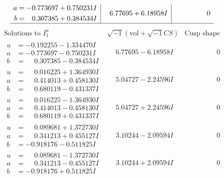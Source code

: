 \documentclass[1p]{elsarticle_modified}
\theoremstyle{definition}
\newcommand{\I}{\sqrt{-1}}
\begin{document}
$$\begin{array}{c|c|c}
\begin{aligned}
a &= -0.773697 + 0.750231 I \\
b &= \phantom{-}0.307385 + 0.384534 I\end{aligned}
 & \phantom{-}6.77695 + 6.18958 I & \phantom{-0.000000 } 0\\
 \hline 
 \end{array}$$\newpage$$\begin{array}{c|c|c}  
\text{Solutions to }I^u_{1}& \I (\text{vol} + \sqrt{-1}CS) & \text{Cusp shape}\\
 \hline 
\begin{aligned}
u &= -0.192255 - 1.334470 I \\
a &= -0.773697 - 0.750231 I \\
b &= \phantom{-}0.307385 - 0.384534 I\end{aligned}
 & \phantom{-}6.77695 - 6.18958 I & \phantom{-0.000000 } 0 \\ \hline\begin{aligned}
u &= \phantom{-}0.016225 + 1.364930 I \\
a &= \phantom{-}0.414013 + 0.458130 I \\
b &= \phantom{-}0.680119 - 0.431337 I\end{aligned}
 & \phantom{-}5.04727 - 2.24596 I & \phantom{-0.000000 } 0 \\ \hline\begin{aligned}
u &= \phantom{-}0.016225 - 1.364930 I \\
a &= \phantom{-}0.414013 - 0.458130 I \\
b &= \phantom{-}0.680119 + 0.431337 I\end{aligned}
 & \phantom{-}5.04727 + 2.24596 I & \phantom{-0.000000 } 0 \\ \hline\begin{aligned}
u &= \phantom{-}0.089681 + 1.372730 I \\
a &= \phantom{-}0.341213 + 0.455127 I \\
b &= -0.918176 - 0.511825 I\end{aligned}
 & \phantom{-}3.10244 - 2.09594 I & \phantom{-0.000000 } 0 \\ \hline\begin{aligned}
u &= \phantom{-}0.089681 - 1.372730 I \\
a &= \phantom{-}0.341213 - 0.455127 I \\
b &= -0.918176 + 0.511825 I\end{aligned}
 & \phantom{-}3.10244 + 2.09594 I & \phantom{-0.000000 } 0 \\ \hline\begin{aligned}

\end{aligned}
\end{array}$$
\end{document}

